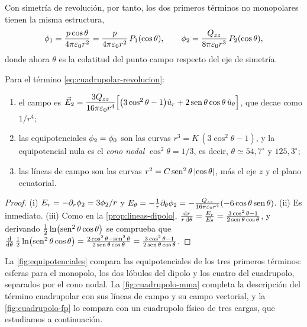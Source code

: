 Con simetría de revolución, por tanto, los dos primeros términos no monopolares tienen la misma estructura,
\begin{equation}\label{eq:dip-cuad-legendre}
  \phi_{1}=\frac{p\cos\theta}{4\pi\varepsilon_{0} r^{2}}=\frac{p}{4\pi\varepsilon_{0} r^{2}}\,P_{1}(\cos\theta),\qquad
  \phi_{2}=\frac{Q_{zz}}{8\pi\varepsilon_{0} r^{3}}\,P_{2}(\cos\theta),
\end{equation}
donde ahora $\theta$ es la colatitud del punto campo respecto del eje de simetría.

\begin{corolario}\label{cor:campo-cuadrupolo}
Para el término \cref{eq:cuadrupolar-revolucion}:
\begin{enumerate}[label=(\roman*)]
  \item el campo es $\vec{E}_{2}=\dfrac{3Q_{zz}}{16\pi\varepsilon_{0} r^{4}}\Bigl[\bigl(3\cos^{2}\theta-1\bigr)\hat{u}_{r}+2\operatorname{sen}\theta\cos\theta\,\hat{u}_{\theta}\Bigr]$, que decae como $1/r^{4}$;
  \item las equipotenciales $\phi_{2}=\phi_0$ son las curvas $r^{3}=K\,(3\cos^{2}\theta-1)$, y la equipotencial nula es el \emph{cono nodal} $\cos^{2}\theta=1/3$,
        es decir, $\theta\simeq54{,}7^{\circ}$ y $125{,}3^{\circ}$;
  \item las líneas de campo son las curvas $r^{2}=C\operatorname{sen}^{2}\theta\,\lvert \cos\theta\rvert$, más el eje $z$ y el plano ecuatorial.
\end{enumerate}
\end{corolario}
\begin{proof}
(i) $E_r=-\partial_r\phi_{2}=3\phi_{2}/r$ y $E_\theta=-\frac1r\partial_\theta\phi_{2}=-\frac{Q_{zz}}{16\pi\varepsilon_{0} r^{4}}(-6\cos\theta\operatorname{sen}\theta)$.
(ii) Es inmediato. (iii) Como en la \cref{prop:lineas-dipolo},
$\frac{\mathrm{d} r}{r\,\mathrm{d}\theta}=\frac{E_r}{E_\theta}=\frac{3\cos^{2}\theta-1}{2\operatorname{sen}\theta\cos\theta}$, y derivando $\frac12\ln\bigl(\operatorname{sen}^{2}\theta\cos\theta\bigr)$ se comprueba que
$\frac{\mathrm{d}}{\mathrm{d}\theta}\,\frac12\ln\bigl(\operatorname{sen}^{2}\theta\cos\theta\bigr)=\frac{2\cos^{2}\theta-\operatorname{sen}^{2}\theta}{2\operatorname{sen}\theta\cos\theta}=\frac{3\cos^{2}\theta-1}{2\operatorname{sen}\theta\cos\theta}$.
\end{proof}



La \cref{fig:equipotenciales} compara las equipotenciales de los tres primeros términos: esferas para el monopolo, los dos lóbulos del dipolo y los cuatro
del cuadrupolo, separados por el cono nodal. La \cref{fig:cuadrupolo-mma} completa la descripción del término cuadrupolar con sus líneas de campo y su campo
vectorial, y la \cref{fig:cuadrupolo-fp} lo compara con un cuadrupolo físico de tres cargas, que estudiamos a continuación.

